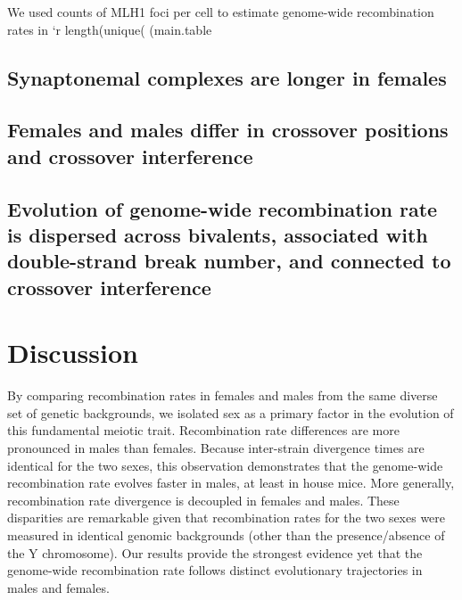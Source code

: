 \documentclass[9pt,lineno]{elife}
\begin{document}
We used counts of MLH1 foci per cell to estimate genome-wide recombination rates in `r length(unique(  (main.table  %

\subsection{Synaptonemal complexes are longer in females}


\subsection{Females and males differ in crossover positions and crossover interference}


\subsection{Evolution of genome-wide recombination rate is dispersed across bivalents, associated with double-strand break number, and connected to crossover interference}


\section{Discussion}

By comparing recombination rates in females and males from the same diverse set of genetic backgrounds, we isolated sex as a primary factor in the evolution of this fundamental meiotic trait. Recombination rate differences are more pronounced in males than females. Because inter-strain divergence times are identical for the two sexes, this observation demonstrates that the genome-wide recombination rate evolves faster in males, at least in house mice. More generally, recombination rate divergence is decoupled in females and males. These disparities are remarkable given that recombination rates for the two sexes were measured in identical genomic backgrounds (other than the presence/absence of the Y chromosome). Our results provide the strongest evidence yet that the genome-wide recombination rate follows distinct evolutionary trajectories in males and females.
\end{document}
